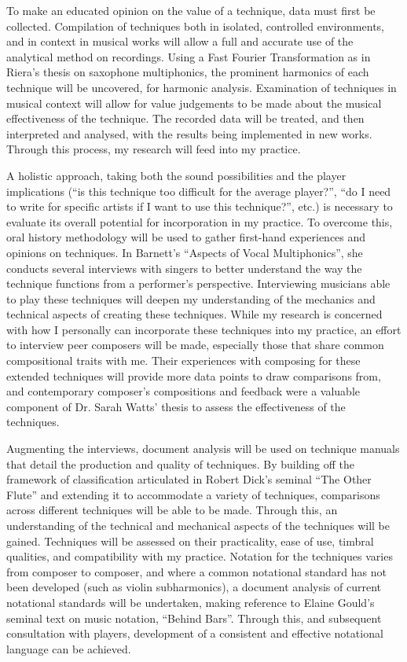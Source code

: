 To make an educated opinion on the value of a technique, data must first be collected. Compilation of techniques both in isolated, controlled environments, and in context in musical works will allow a full and accurate use of the analytical method on recordings. Using a Fast Fourier Transformation as in Riera’s thesis on saxophone multiphonics, the prominent harmonics of each technique will be uncovered, for harmonic analysis.\autocite{rieraComparativeStudySaxophone2014} Examination of techniques in musical context will allow for value judgements to be made about the musical effectiveness of the technique. The recorded data will be treated, and then interpreted and analysed, with the results being implemented in new works.\autocite{torresMultiphonicsCompositionalElement2012} Through this process, my research will feed into my practice.

A holistic approach, taking both the sound possibilities and the player implications (“is this technique too difficult for the average player?”, “do I need to write for specific artists if I want to use this technique?”, etc.) is necessary to evaluate its overall potential for incorporation in my practice. To overcome this, oral history methodology will be used to gather first-hand experiences and opinions on techniques. In Barnett’s “Aspects of Vocal Multiphonics”, she conducts several interviews with singers to better understand the way the technique functions from a performer’s perspective.\autocite{barnettAspectsVocalMultiphonics1977} Interviewing musicians able to play these techniques will deepen my understanding of the mechanics and technical aspects of creating these techniques. While my research is concerned with how I personally can incorporate these techniques into my practice, an effort to interview peer composers will be made, especially those that share common compositional traits with me. Their experiences with composing for these extended techniques will provide more data points to draw comparisons from, and contemporary composer’s compositions and feedback were a valuable component of Dr. Sarah Watts’ thesis to assess the effectiveness of the techniques.

Augmenting the interviews, document analysis will be used on technique manuals that detail the production and quality of techniques. By building off the framework of classification articulated in Robert Dick’s seminal “The Other Flute” and extending it to accommodate a variety of techniques, comparisons across different techniques will be able to be made.\autocite{dickOtherFlute1989} Through this, an understanding of the technical and mechanical aspects of the techniques will be gained. Techniques will be assessed on their practicality, ease of use, timbral qualities, and compatibility with my practice. Notation for the techniques varies from composer to composer, and where a common notational standard has not been developed (such as violin subharmonics), a document analysis of current notational standards will be undertaken, making reference to Elaine Gould’s seminal text on music notation, “Behind Bars”.\autocite{gouldBars2011} Through this, and subsequent consultation with players, development of a consistent and effective notational language can be achieved.

